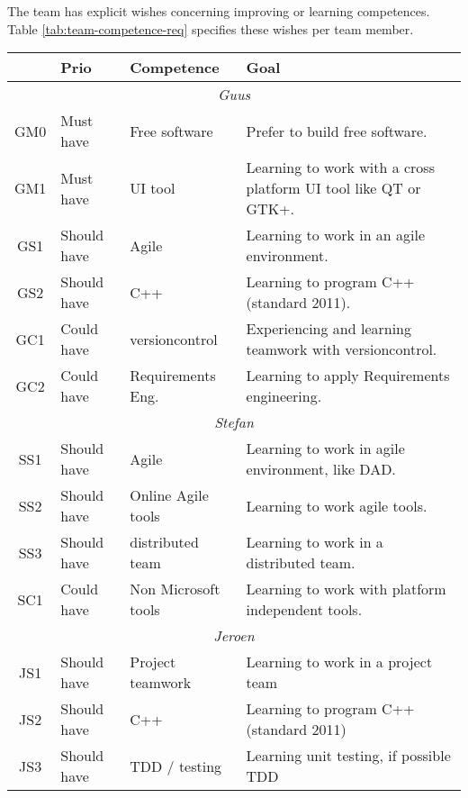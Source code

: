 
The team has explicit wishes concerning improving or learning competences. Table
\ref{tab:team-competence-req} specifies these wishes per team member.

\begin{center}
    \begin{tabular}{cllp{17em}}
        \hline
        & {\bf Prio} & {\bf Competence}    & {\bf Goal}\\
        \hline
        \multicolumn{4}{c}{\sf\emph{Guus}}\\
        \hline
		GM0 & Must have    & Free software & Prefer to build free software.\\
        GM1 & Must have    & UI tool       & Learning to work with a cross platform UI tool like QT or GTK+.\\
        GS1 & Should have  & Agile		   & Learning to work in an agile environment.\\
        GS2 & Should have  & C++		   & Learning to program C++ (standard 2011).\\
		GC1 & Could have   & versioncontrol	   & Experiencing and learning teamwork with versioncontrol.\\
        GC2 & Could have   & Requirements Eng.   & Learning to apply Requirements engineering.\\
        \hline
        \multicolumn{4}{c}{\sf\emph{Stefan}}\\
        \hline
        SS1 & Should have  & Agile		   & Learning to work in agile environment, like DAD.\\
        SS2 & Should have  & Online Agile tools  & Learning to work agile tools.\\
        SS3 & Should have  & distributed team    & Learning to work in a distributed team.\\
        SC1 & Could have   & Non Microsoft tools & Learning to work with platform independent tools.\\
        \hline
        \multicolumn{4}{c}{\sf\emph{Jeroen}}\\
        \hline
        JS1 & Should have & Project teamwork & Learning to work in a project team\\
		JS2 & Should have & C++            & Learning to program C++ (standard 2011)\\
		JS3 & Should have & TDD / testing  & Learning unit testing, if possible TDD\\
        \hline
    \end{tabular}
    \label{tab:team-competence-req}
\end{center}
